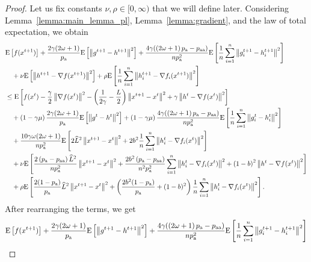 \documentclass{article}
\newcommand*{\probavailable}{\ensuremath{p_{\textnormal{a}}}}
\newcommand*{\probpairaa}{\ensuremath{p_{\textnormal{aa}}}}
\begin{document}
\begin{proof}
  Let us fix constants $\nu, \rho \in [0,\infty)$ that we will define later. Considering Lemma~\ref{lemma:main_lemma_pl}, Lemma~\ref{lemma:gradient}, and the law of total expectation, we obtain
    \begin{align*}
      &\Exp{f(x^{t + 1})} + \frac{2\gamma (2\omega + 1)}{\probavailable} \Exp{\norm{g^{t+1} - h^{t+1}}^2} + \frac{4 \gamma (\left(2 \omega + 1\right)\probavailable - \probpairaa)}{n \probavailable^2} \Exp{\frac{1}{n}\sum_{i=1}^n\norm{g^{t+1}_i - h^{t+1}_i}^2}\\
      &\quad  + \nu \Exp{\norm{h^{t+1} - \nabla f(x^{t+1})}^2} + \rho \Exp{\frac{1}{n}\sum_{i=1}^n\norm{h^{t+1}_i - \nabla f_i(x^{t+1})}^2}\\
      &\leq \Exp{f(x^t) - \frac{\gamma}{2}\norm{\nabla f(x^t)}^2 - \left(\frac{1}{2\gamma} - \frac{L}{2}\right)
      \norm{x^{t+1} - x^t}^2 + \gamma \norm{h^{t} - \nabla f(x^t)}^2}\nonumber\\
      &\quad + \left(1 - \gamma \mu\right)\frac{2\gamma(2\omega + 1)}{\probavailable}\Exp{\norm{g^{t} - h^t}^2} + \left(1 - \gamma \mu\right)\frac{4 \gamma (\left(2 \omega + 1\right)\probavailable - \probpairaa)}{n \probavailable^2}\Exp{\frac{1}{n} \sum_{i=1}^n\norm{g^t_i - h^{t}_i}^2} \\
      &\quad + \frac{10 \gamma \omega (2 \omega + 1)}{n \probavailable^2} \Exp{2\widehat{L}^2\norm{x^{t+1} - x^{t}}^2 + 2b^2 \frac{1}{n}\sum_{i=1}^n \norm{h^t_i - \nabla f_i(x^{t})}^2} \\
      &\quad + \nu \Exp{\frac{2\left(\probavailable - \probpairaa\right)\widehat{L}^2}{n \probavailable^2} \norm{x^{t+1} - x^{t}}^2 + \frac{2 b^2 \left(\probavailable - \probpairaa\right)}{n^2 \probavailable^2} \sum_{i=1}^n \norm{h^t_i - \nabla f_i(x^{t})}^2 + \left(1 - b\right)^2 \norm{h^{t} - \nabla f(x^{t})}^2} \\
      &\quad + \rho \Exp{\frac{2(1 - \probavailable)}{\probavailable} \widehat{L}^2 \norm{x^{t+1} - x^{t}}^2 + \left(\frac{2 b^2 (1 - \probavailable)}{\probavailable} + (1 - b)^2\right) \frac{1}{n}\sum_{i=1}^n \norm{h^{t}_i - \nabla f_i(x^{t})}^2}.
    \end{align*}
    After rearranging the terms, we get
    \begin{align*}
      &\Exp{f(x^{t + 1})} + \frac{2\gamma (2\omega + 1)}{\probavailable} \Exp{\norm{g^{t+1} - h^{t+1}}^2} + \frac{4 \gamma (\left(2 \omega + 1\right)\probavailable - \probpairaa)}{n \probavailable^2} \Exp{\frac{1}{n}\sum_{i=1}^n\norm{g^{t+1}_i - h^{t+1}_i}^2}\\

\end{align*}
\end{proof}
\end{document}
